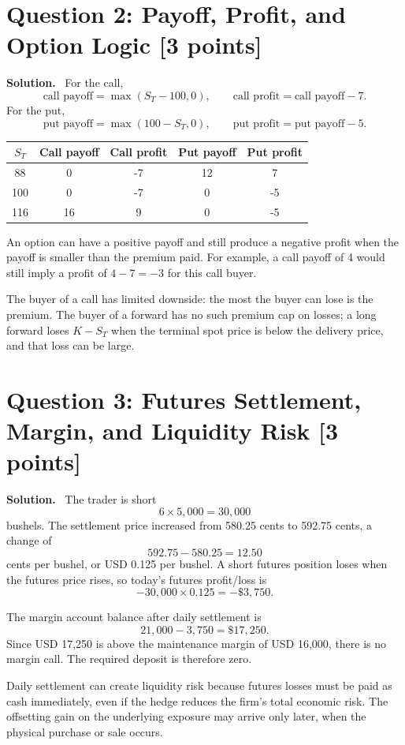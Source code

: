 \documentclass[11pt]{article}
\newcommand{\pts}[1]{\hspace{0.35em}\textnormal{\textbf{[#1 points]}}}
\newcommand{\St}{S_T}
\newenvironment{solution}{\par\noindent\textbf{Solution.}\ }{\par}
\begin{document}
\section*{Question 2: Payoff, Profit, and Option Logic \pts{3}}

\begin{solution}
For the call,
\[
    \text{call payoff}=\max(\St-100,0),
    \qquad
    \text{call profit}=\text{call payoff}-7.
\]
For the put,
\[
    \text{put payoff}=\max(100-\St,0),
    \qquad
    \text{put profit}=\text{put payoff}-5.
\]

\begin{center}
\begin{tabular}{@{}ccccc@{}}
\toprule
$\St$ & Call payoff & Call profit & Put payoff & Put profit \\
\midrule
88  & 0  & -7 & 12 & 7  \\
100 & 0  & -7 & 0  & -5 \\
116 & 16 & 9  & 0  & -5 \\
\bottomrule
\end{tabular}
\end{center}

An option can have a positive payoff and still produce a negative profit when
the payoff is smaller than the premium paid. For example, a call payoff of 4
would still imply a profit of $4-7=-3$ for this call buyer.

The buyer of a call has limited downside: the most the buyer can lose is the
premium. The buyer of a forward has no such premium cap on losses; a long
forward loses $K-\St$ when the terminal spot price is below the delivery price,
and that loss can be large.
\end{solution}

\section*{Question 3: Futures Settlement, Margin, and Liquidity Risk \pts{3}}

\begin{solution}
The trader is short
\[
    6\times 5{,}000=30{,}000
\]
bushels. The settlement price increased from 580.25 cents to 592.75 cents, a
change of
\[
    592.75-580.25=12.50
\]
cents per bushel, or USD 0.125 per bushel. A short futures position loses when
the futures price rises, so today's futures profit/loss is
\[
    -30{,}000\times 0.125=-\$3{,}750.
\]

The margin account balance after daily settlement is
\[
    21{,}000-3{,}750=\$17{,}250.
\]
Since USD 17,250 is above the maintenance margin of USD 16,000, there is no
margin call. The required deposit is therefore zero.

Daily settlement can create liquidity risk because futures losses must be paid
as cash immediately, even if the hedge reduces the firm's total economic risk.
The offsetting gain on the underlying exposure may arrive only later, when the
physical purchase or sale occurs.
\end{solution}
\end{document}
